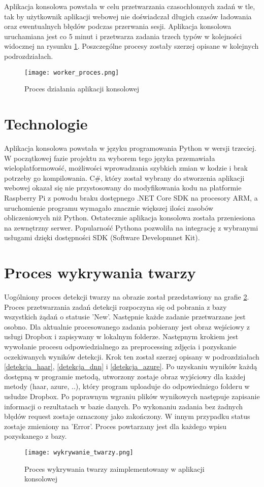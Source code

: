 Aplikacja konsolowa powstała w celu przetwarzania czasochłonnych zadań w tle, tak by użytkownik aplikacji webowej nie doświadczał długich czasów ładowania oraz ewentualnych błędów podczas przerwania sesji. Aplikacja konsolowa uruchamiana jest co 5 minut i przetwarza zadania trzech typów w kolejności widocznej na rysunku \ref{fig:worker_proces}. Poszczególne procesy zostały szerzej opisane w kolejnych podrozdziałach.
\begin{figure}[H]
	\centering
	\texttt{[image: worker\_proces.png]}
	\caption{Proces działania aplikacji konsolowej}
	\label{fig:worker_proces}
\end{figure}

\section{Technologie}
Aplikacja konsolowa powstała w języku programowania Python w wersji trzeciej. W początkowej fazie projektu za wyborem tego języka przemawiała wieloplatformowość, możliwości wprowadzania szybkich zmian w kodzie i brak potrzeby go kompilowania. C\#, który został wybrany do stworzenia aplikacji webowej okazał się nie przystosowany do modyfikowania kodu na platformie Raspberry Pi z powodu braku dostępnego .NET Core SDK na procesory ARM, a uruchomienie programu wymagało znacznie większej ilości zasobów obliczeniowych niż Python. Ostatecznie aplikacja konsolowa została przeniesiona na zewnętrzny serwer. Popularność Pythona pozwoliła na
integrację z wybranymi usługami dzięki dostępności SDK (Software Developmnet Kit).

\section{Proces wykrywania twarzy}
Uogólniony proces detekcji twarzy na obrazie został przedstawiony na grafie \ref{fig:wykrywanie_proces}.
Proces przetwarzania zadań detekcji rozpoczyna się od pobrania z bazy wszystkich żądań o statusie 'New'. Następnie każde zadanie przetwarzane jest osobno. Dla aktualnie procesowanego zadania pobierany jest obraz wejściowy z usługi Dropbox i zapisywany w lokalnym folderze. Następnym krokiem jest wywołanie procesu odpowiedzialnego za preprocessing zdjęcia i pozyskanie oczekiwanych wyników detekcji. Krok ten został szerzej opisany w podrozdziałach \ref{detekcja_haar}, \ref{detekcja_dnn} i \ref{detekcja_azure}. Po uzyskaniu wyników każdą dostępną w programie metodą, utworzony zostaje obraz wyjściowy dla każdej metody (haar, azure, ..), który program uploaduje do odpowiedniego folderu w usłudze Dropbox. Po poprawnym wgraniu plików wynikowych następuje zapisanie informacji o rezultatach w bazie danych. Po wykonaniu zadania bez żadnych błędów request zostaje oznaczony jako zakończony. W innym przypadku status zostaje zmieniony na 'Error'. Proces powtarzany jest dla każdego wpisu pozyskanego z bazy.
\begin{figure}[H]
	\centering
	\texttt{[image: wykrywanie\_twarzy.png]}
	\caption{Proces wykrywania twarzy zaimplementowany w aplikacji konsolowej}
	\label{fig:wykrywanie_proces}
\end{figure}

